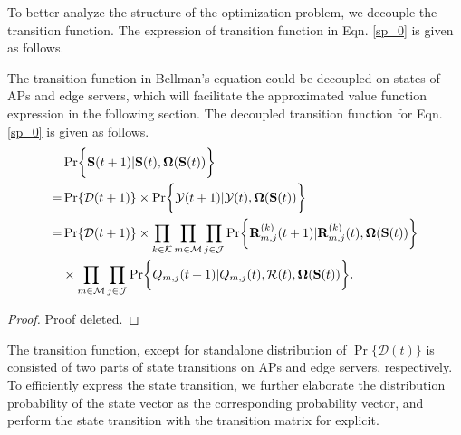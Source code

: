 To better analyze the structure of the optimization problem, we decouple the transition function.
The expression of transition function in Eqn. \ref{sp_0} is given as follows.
\begin{lemma}
    The transition function in Bellman's equation could be decoupled on states of APs and edge servers, which will facilitate the approximated value function expression in the following section.
    The decoupled transition function for Eqn. \ref{sp_0} is given as follows.
    \begin{align}
        & \Pr\Brace{ \Stat({t+1})|\Stat({t}), \Policy(\Stat({t})) }
        \nonumber\\
        =& \Pr\{\mathcal{D}({t+1})\} \times \Pr\Brace{ \Obsv({t+1})|\Obsv({t}), \Policy(\Stat({t}))}
        \nonumber\\
        =& \Pr\{\mathcal{D}({t+1})\} \times \prod_{k\in\apSet}\prod_{m\in\esSet}\prod_{j\in\jSpace}
                \Pr\Brace{
                    \vec{R}^{(k)}_{m,j}({t+1}) | \vec{R}^{(k)}_{m,j}({t}),
                    \Policy(\Stat({t}))
                }  
            \nonumber\\
            & \times \prod_{m\in\esSet}\prod_{j\in\jSpace}
                \Pr\Brace{
                    Q_{m,j}({t+1})|Q_{m,j}({t}), \mathcal{R}({t}), \Policy(\Stat({t}))
                }.
    \end{align}
\end{lemma}
\begin{proof}
    Proof deleted.
\end{proof}

The transition function, except for standalone distribution of $\Pr\{\mathcal{D}({t})\}$ is consisted of two parts of state transitions on APs and edge servers, respectively.
To efficiently express the state transition, we further elaborate the distribution probability of the state vector as the corresponding probability vector, and perform the state transition with the transition matrix for explicit.

